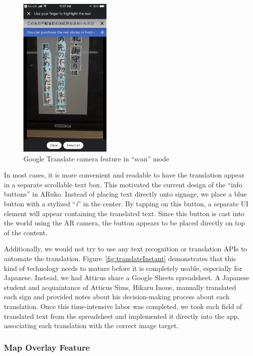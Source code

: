 \documentclass[a4paper, 10pt, american, titlepage]{article}
\begin{document}
\begin{figure}[h]
	\centering
	\includegraphics[width=0.4\textwidth]{translate-scan.jpg}
	\caption{Google Translate camera feature in ``scan'' mode}
	\label{fig:translateScan}
\end{figure}

In most cases, it is more convenient and readable to have the translation appear
in a separate scrollable text box. This motivated the current design of the
``info buttons'' in ARuko. Instead of placing text directly onto signage, we
place a blue button with a stylized ``\textit{i}'' in the center. By tapping on
this button, a separate UI element will appear containing the translated text.
Since this button is cast into the world using the AR camera, the button appears
to be placed directly on top of the content.

Additionally, we would not try to use any text recognition or translation APIs
to automate the translation. Figure~\ref{fig:translateInstant} demonstrates that
this kind of technology needs to mature before it is completely usable,
especially for Japanese. Instead, we had Atticus share a Google Sheets
spreadsheet. A Japanese student and acquaintance of Atticus Sims, Hikaru Inoue,
manually translated each sign and provided notes about his decision-making
process about each translation. Once this time-intensive labor was completed, we
took each field of translated text from the spreadsheet and implemented it
directly into the app, associating each translation with the correct image
target.

\subsubsection{Map Overlay Feature}
\label{sec:mapOverlayFeature}
\end{document}
